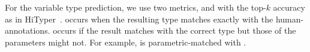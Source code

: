 For the variable type prediction, we use two metrics,
 and  with the top-$k$
accuracy as in HiTyper~\cite{HiTyper-icse22}. 
occurs when the resulting type matches exactly with the
human-annotations.  occurs if the result
matches with the correct type but those of the parameters might
not. For example,  is 
parametric-matched with .


